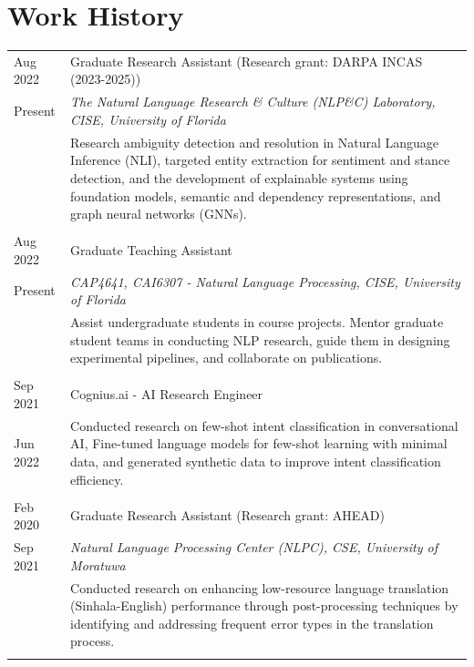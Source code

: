 \section{Work History}
\begin{tabular}{p{1.5cm}|p{15.8cm}}

Aug 2022 & Graduate Research Assistant (Research grant: DARPA INCAS (2023-2025)) \textsc{}  \\Present&\emph{The Natural Language Research \& Culture (NLP\&C) Laboratory, CISE, University of Florida} \\ & \footnotesize{Research ambiguity detection and resolution in Natural Language Inference (NLI), targeted entity extraction for sentiment and stance detection, and the development of explainable systems using foundation models, semantic and dependency representations, and graph neural networks (GNNs).}\\\multicolumn{2}{c}{} \vspace{-0.08in}\\

Aug 2022 & Graduate Teaching Assistant \textsc{}  \\Present&\emph{CAP4641, CAI6307 - Natural Language Processing, CISE, University of Florida} \\ & \footnotesize{Assist undergraduate students in course projects. Mentor graduate student teams in conducting NLP research, guide them in designing experimental pipelines, and collaborate on publications.}\\\multicolumn{2}{c}{} \vspace{-0.08in}\\

Sep 2021 & Cognius.ai - AI Research Engineer \textsc{}\\Jun 2022&\footnotesize{Conducted research on few-shot intent classification in conversational AI, Fine-tuned language models for few-shot learning with minimal data, and generated synthetic data to improve intent classification efficiency.}\\\multicolumn{2}{c}{} \vspace{-0.08in}\\

Feb 2020 & Graduate Research Assistant (Research grant: AHEAD) \textsc{}  \\Sep 2021&\emph{Natural Language Processing Center (NLPC), CSE, University of Moratuwa} \\ & \footnotesize{Conducted research on enhancing low-resource language translation (Sinhala-English) performance through post-processing techniques by identifying and addressing frequent error types in the translation process.} \\\multicolumn{2}{c}{} \vspace{-0.08in}\\
 

\end{tabular}
